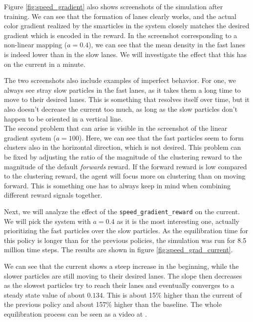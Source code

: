 Figure \ref{fig:speed_gradient} also shows screenshots of the simulation after training. We can see that the formation of lanes clearly works, and the actual color gradient realized by the smarticles in the system closely matches the desired gradient which is encoded in the reward. In the screenshot corresponding to a non-linear mapping ($a=0.4$), we can see that the mean density in the fast lanes is indeed lower than in the slow lanes. We will investigate the effect that this has on the current in a minute. 


The two screenshots also include examples of imperfect behavior. For one, we always see stray slow particles in the fast lanes, as it takes them a long time to move to their desired lanes. This is something that resolves itself over time, but it also doesn't decrease the current too much, as long as the slow particles don't happen to be oriented in a vertical line. 
\\
The second problem that can arise is visible in the screenshot of the linear gradient system ($a=100$). Here, we can see that the fast particles seem to form clusters also in the horizontal direction, which is not desired. This problem can be fixed by adjusting the ratio of the magnitude of the clustering reward to the magnitude of the default \textit{forwards} reward. If the forward reward is low compared to the clustering reward, the agent will focus more on clustering than on moving forward. This is something one has to always keep in mind when combining different reward signals together.


Next, we will analyze the effect of the \texttt{speed\_gradient\_reward} on the current. We will pick the system with $a=0.4$ as it is the most interesting one, actually prioritizing the fast particles over the slow particles. As the equilibration time for this policy is longer than for the previous policies, the simulation was run for 8.5 million time steps. The results are shown in figure \ref{fig:speed_grad_current}. 


We can see that the current shows a steep increase in the beginning, while the slower particles are still moving to their desired lanes. The slope then decreases as the slowest particles try to reach their lanes and eventually converges to a steady state value of about $0.134$. This is about 15\% higher than the current of the previous policy and about 157\% higher than the baseline. The whole equilibration process can be seen as a video at \cite{maertens_smarticle_lane_vid}.

